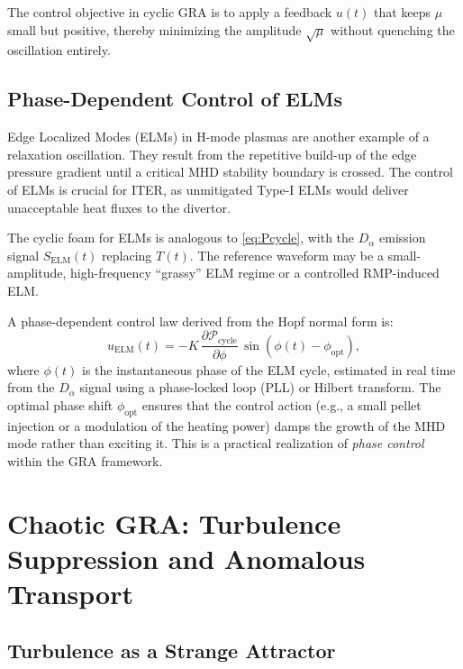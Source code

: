 \documentclass[12pt,a4paper]{article}
\begin{document}
The control objective in cyclic GRA is to apply a feedback $u(t)$ that keeps $\mu$ small but positive, thereby minimizing the amplitude $\sqrt{\mu}$ without quenching the oscillation entirely.

\subsection{Phase-Dependent Control of ELMs}

Edge Localized Modes (ELMs) in H-mode plasmas are another example of a relaxation oscillation. They result from the repetitive build-up of the edge pressure gradient until a critical MHD stability boundary is crossed. The control of ELMs is crucial for ITER, as unmitigated Type-I ELMs would deliver unacceptable heat fluxes to the divertor.

The cyclic foam for ELMs is analogous to \eqref{eq:Pcycle}, with the $D_\alpha$ emission signal $S_{\text{ELM}}(t)$ replacing $T(t)$. The reference waveform may be a small-amplitude, high-frequency ``grassy'' ELM regime or a controlled RMP-induced ELM.

A phase-dependent control law derived from the Hopf normal form is:
\begin{equation}
u_{\text{ELM}}(t) = -K \, \frac{\partial \mathcal{P}_{\text{cycle}}}{\partial \phi} \, \sin(\phi(t) - \phi_{\text{opt}}),
\label{eq:phase_control}
\end{equation}
where $\phi(t)$ is the instantaneous phase of the ELM cycle, estimated in real time from the $D_\alpha$ signal using a phase-locked loop (PLL) or Hilbert transform. The optimal phase shift $\phi_{\text{opt}}$ ensures that the control action (e.g., a small pellet injection or a modulation of the heating power) damps the growth of the MHD mode rather than exciting it. This is a practical realization of \textit{phase control} within the GRA framework.

\section{Chaotic GRA: Turbulence Suppression and Anomalous Transport}
\label{sec:chaotic}

\subsection{Turbulence as a Strange Attractor}
\end{document}

